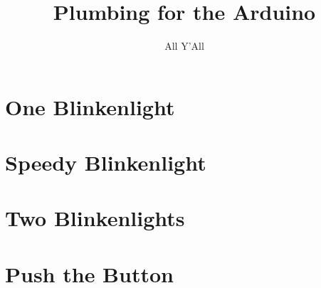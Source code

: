 \documentclass[a5paper]{scrbook}
\title{Plumbing for the Arduino}
\author{All Y'All}
\begin{document}
	
\maketitle
\tableofcontents

\chapter{One Blinkenlight}


\chapter{Speedy Blinkenlight}


\chapter{Two Blinkenlights}


\chapter{Push the Button}

\end{document}
